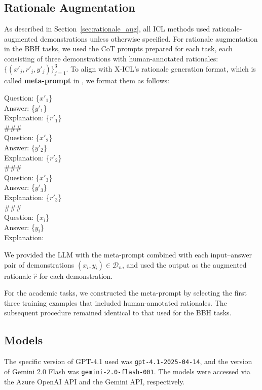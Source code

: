 \documentclass[11pt]{article}
\newcommand{\D}{\mathcal{D}}
\begin{document}
\subsection{Rationale Augmentation}
\label{app:rationale_aug_details}
As described in Section~\ref{sec:rationale_aug}, all ICL methods used rationale-augmented demonstrations unless otherwise specified.
For rationale augmentation in the BBH tasks, we used the CoT prompts prepared for each task, each consisting of three demonstrations with human-annotated rationales: $\{(x'_j, r'_j, y'_j)\}_{j=1}^{3}$.
To align with X-ICL's rationale generation format, which is called \textbf{meta-prompt} in \citet{he-etal-2024-using}, we format them as follows:

\begin{tcolorbox}[title=Format of Meta-Prompt, colback=gray!10, colframe=black!70, boxrule=0.5pt, top=0pt, bottom=0pt, left=0pt, right=0pt, arc=0.8mm]
Question: \{$x'_1$\}\\
Answer: \{$y'_1$\}\\
Explanation: \{$r'_1$\}\\
\#\#\#\\
Question: \{$x'_2$\}\\
Answer: \{$y'_2$\}\\
Explanation: \{$r'_2$\}\\
\#\#\#\\
Question: \{$x'_3$\}\\
Answer: \{$y'_3$\}\\
Explanation: \{$r'_3$\}\\\#\#\#\\
Question: \{$x_i$\}\\
Answer: \{$y_i$\}\\
Explanation:
\end{tcolorbox}

We provided the LLM with the meta-prompt combined with each input--answer pair of demonstrations $(x_i, y_i) \in \D_n$, and used the output as the augmented rationale $\hat{r}$ for each demonstration.

For the academic tasks, we constructed the meta-prompt by selecting the first three training examples that included human-annotated rationales.
The subsequent procedure remained identical to that used for the BBH tasks.


\subsection{Models}
\label{app:models}
The specific version of GPT-4.1 used was \texttt{gpt-4.1-2025-04-14}, and the version of Gemini 2.0 Flash was \texttt{gemini-2.0-flash-001}.
The models were accessed via the Azure OpenAI API and the Gemini API, respectively.
\end{document}

